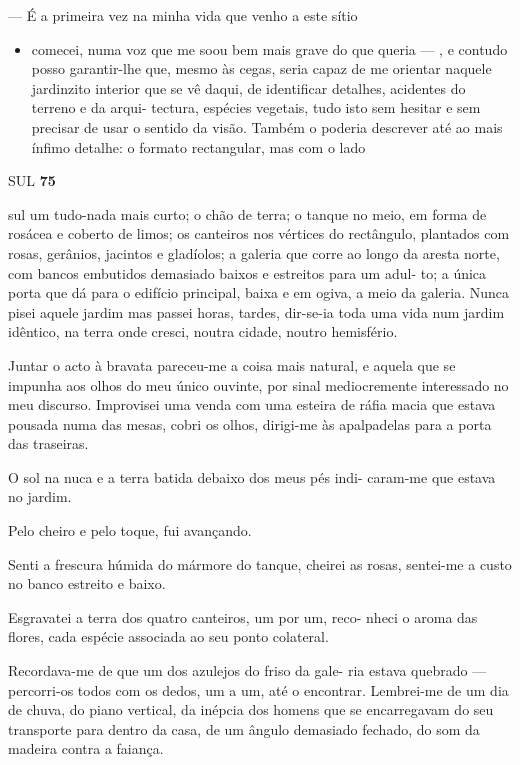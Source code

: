 --- É a primeira vez na minha vida que venho a este sítio

\begin{itemize}
\tightlist
\item
  comecei, numa voz que me soou bem mais grave do que queria --- , e
  contudo posso garantir-lhe que, mesmo às cegas, seria capaz de me
  orientar naquele jardinzito interior que se vê daqui, de identificar
  detalhes, acidentes do terreno e da arqui- tectura, espécies vegetais,
  tudo isto sem hesitar e sem precisar de usar o sentido da visão.
  Também o poderia descrever até ao mais ínfimo detalhe: o formato
  rectangular, mas com o lado
\end{itemize}

SUL \textbf{75}

sul um tudo-nada mais curto; o chão de terra; o tanque no meio, em forma
de rosácea e coberto de limos; os canteiros nos vértices do rectângulo,
plantados com rosas, gerânios, jacintos e gladíolos; a galeria que corre
ao longo da aresta norte, com bancos embutidos demasiado baixos e
estreitos para um adul- to; a única porta que dá para o edifício
principal, baixa e em ogiva, a meio da galeria. Nunca pisei aquele
jardim mas passei horas, tardes, dir-se-ia toda uma vida num jardim
idêntico, na terra onde cresci, noutra cidade, noutro hemisfério.

Juntar o acto à bravata pareceu-me a coisa mais natural, e aquela que se
impunha aos olhos do meu único ouvinte, por sinal mediocremente
interessado no meu discurso. Improvisei uma venda com uma esteira de
ráfia macia que estava pousada numa das mesas, cobri os olhos, dirigi-me
às apalpadelas para a porta das traseiras.

O sol na nuca e a terra batida debaixo dos meus pés indi- caram-me que
estava no jardim.

Pelo cheiro e pelo toque, fui avançando.

Senti a frescura húmida do mármore do tanque, cheirei as rosas,
sentei-me a custo no banco estreito e baixo.

Esgravatei a terra dos quatro canteiros, um por um, reco- nheci o aroma
das flores, cada espécie associada ao seu ponto colateral.

Recordava-me de que um dos azulejos do friso da gale- ria estava
quebrado --- percorri-os todos com os dedos, um a um, até o encontrar.
Lembrei-me de um dia de chuva, do piano vertical, da inépcia dos homens
que se encarregavam do seu transporte para dentro da casa, de um ângulo
demasiado fechado, do som da madeira contra a faiança.

